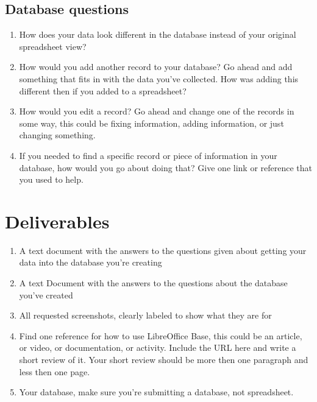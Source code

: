 \documentclass[12pt]{article}
\begin{document}
    \subsection*{Database questions}
    \begin{enumerate}
        \item How does your data look different in the database instead of your original spreadsheet view?
        \item How would you add another record to your database?  Go ahead and add something that fits in with the data you've collected.  How was adding this different then if you added to a spreadsheet?
        \item How would you edit a record? Go ahead and change one of the records in some way, this could be fixing information, adding information, or just changing something. 
        \item If you needed to find a specific record or piece of information in your database, how would you go about doing that? Give one link or reference that you used to help.

    \end{enumerate}

\section*{Deliverables}
\begin{enumerate}
    \item A text document with the answers to the questions given about getting your data into the database you're creating
    \item A text Document with the answers to the questions about the database you've created
    \item All requested screenshots, clearly labeled to show what they are for
    \item Find one reference for how to use LibreOffice Base, this could be an article, or video, or documentation, or activity.  Include the URL here and write a short review of it. Your short review should be more then one paragraph and less then one page.
    \item Your database, make sure you're submitting a database, not spreadsheet. 
\end{enumerate} 
\end{document}
